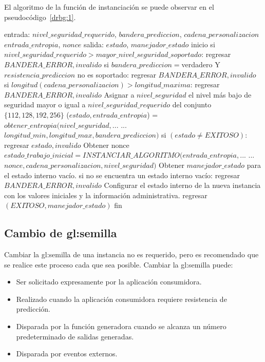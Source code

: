 El algoritmo de la función de instanciación se puede observar en el
pseudocódigo~\ref{drbg:1}.

\begin{pseudocodigo}[caption={DRBG, instanciación.}, label={drbg:1}]
    entrada:  $nivel\_seguridad\_requerido$, $bandera\_prediccion$, $cadena\_personalizacion$
              $entrada\_entropia$, $nonce$
    salida:   $estado$, $manejador\_estado$
    inicio
      si $nivel\_seguridad\_requerido > mayor\_nivel\_seguridad\_soportado$:
        regresar $BANDERA\_ERROR, invalido$
      si $bandera\_prediccion = $verdadero Y $resistencia\_prediccion$ no es soportado:
        regresar $BANDERA\_ERROR, invalido$
      si $longitud(cadena\_personalizacion) > longitud\_maxima$:
        regresar $BANDERA\_ERROR, invalido$
      Asignar a $nivel\_seguridad$ el nivel más bajo de seguridad mayor o igual
        a $nivel\_seguridad\_requerido$ del conjunto $\{112, 128, 192, 256\}$
      ($estado, entrada\_entropia$) = $obtener\_entropia(nivel\_seguridad,$...
        ... $longitud\_min, longitud\_max, bandera\_prediccion)$
      si $(estado \neq EXITOSO)$:
        regresar $estado, invalido$
      Obtener nonce
      $estado\_trabajo\_inicial = INSTANCIAR\_ALGORITMO(entrada\_entropia,$...
        ... $nonce, cadena\_personalizacion, nivel\_seguridad)$
      Obtener $manejador\_estado$ para el estado interno vacío.
      si no se encuentra un estado interno vacío:
        regresar $BANDERA\_ERROR, invalido$
      Configurar el estado interno de la nueva instancia con los valores iniciales
        y la información administrativa.
      regresar $(EXITOSO, manejador\_estado)$
    fin
\end{pseudocodigo}

\subsection{Cambio de \gls{gl:semilla}}

Cambiar la \gls{gl:semilla} de una instancia no es requerido, pero es
recomendado que se realice este proceso cada que sea posible. Cambiar la
\gls{gl:semilla} puede:

\begin{itemize}
  \item Ser solicitado expresamente por la aplicación consumidora.
  \item Realizado cuando la aplicación consumidora requiere resistencia de
    predicción.
  \item Disparada por la función generadora cuando se alcanza un número
    predeterminado de salidas generadas.
  \item Disparada por eventos externos.
\end{itemize}

